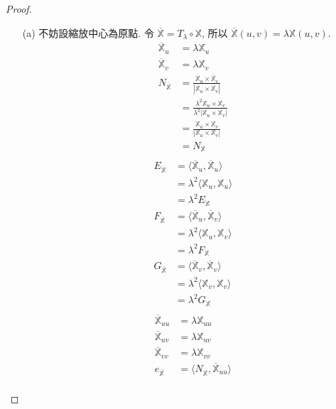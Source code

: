 \documentclass[10pt,a4paper]{article}
\begin{document}
\begin{proof}
\begin{enumerate}
\item[(a)]
不妨設縮放中心為原點. 令 $\overline{\mathbb{X}}=T_\lambda\circ \mathbb{X}$, 所以 $\overline{\mathbb{X}}(u,v)=\lambda\mathbb{X}(u,v)$.\\
\begin{align*}
\overline{\mathbb{X}}_u&=\lambda\mathbb{X}_u\\
\overline{\mathbb{X}}_v&=\lambda\mathbb{X}_v\\
N_{\overline{\mathbb{X}}}&=\frac{\overline{\mathbb{X}}_u\times\overline{\mathbb{X}}_v}{|\overline{\mathbb{X}}_u\times\overline{\mathbb{X}}_v|}\\
&=\frac{\lambda^2\mathbb{X}_u\times\mathbb{X}_v}{\lambda^2|\mathbb{X}_u\times\mathbb{X}_v|}\\
&=\frac{\mathbb{X}_u\times\mathbb{X}_v}{|\mathbb{X}_u\times\mathbb{X}_v|}\\
&=N_{\mathbb{X}}\\
\end{align*}
\begin{align*}
E_{\overline{\mathbb{X}}} &= \langle \overline{\mathbb{X}}_u, \overline{\mathbb{X}}_u\rangle\\
&= \lambda^2\langle \mathbb{X}_u, \mathbb{X}_u\rangle\\
&= \lambda^2 E_{\mathbb{X}}\\
F_{\overline{\mathbb{X}}} &= \langle \overline{\mathbb{X}}_u, \overline{\mathbb{X}}_v\rangle\\
&= \lambda^2\langle \mathbb{X}_u, \mathbb{X}_v\rangle\\
&= \lambda^2 F_{\mathbb{X}}\\
G_{\overline{\mathbb{X}}} &= \langle \overline{\mathbb{X}}_v, \overline{\mathbb{X}}_v\rangle\\
&= \lambda^2\langle \mathbb{X}_v, \mathbb{X}_v\rangle\\
&= \lambda^2 G_{\mathbb{X}}\\
\end{align*}
\begin{align*}
\overline{\mathbb{X}}_{uu}&=\lambda\mathbb{X}_{uu}\\
\overline{\mathbb{X}}_{uv}&=\lambda\mathbb{X}_{uv}\\
\overline{\mathbb{X}}_{vv}&=\lambda\mathbb{X}_{vv}\\
e_{\overline{\mathbb{X}}} &= \langle N_{\overline{\mathbb{X}}}, \overline{\mathbb{X}}_{uu}\rangle\\

\end{align*}
\end{enumerate}
\end{proof}
\end{document}
